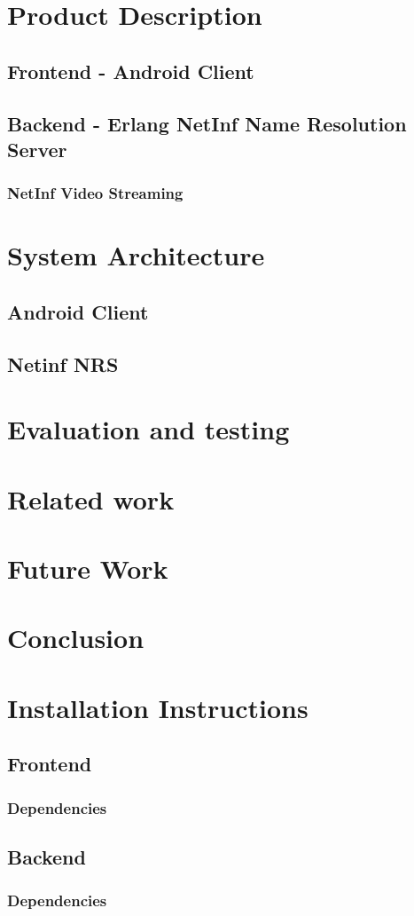 \documentclass[11pt]{report}
\begin{document}
\chapter{Product Description}
\section {Frontend - Android Client}
\section {Backend - Erlang NetInf Name Resolution Server}
\subsection{NetInf Video Streaming}
\chapter{System Architecture}
\section {Android Client}
\section {Netinf NRS}
\chapter{Evaluation and testing}
\chapter{Related work}
\chapter{Future Work}
\chapter{Conclusion}
\chapter{Installation Instructions}
\section {Frontend}
\subsection {Dependencies}
\section {Backend}
\subsection {Dependencies}
\end{document}
